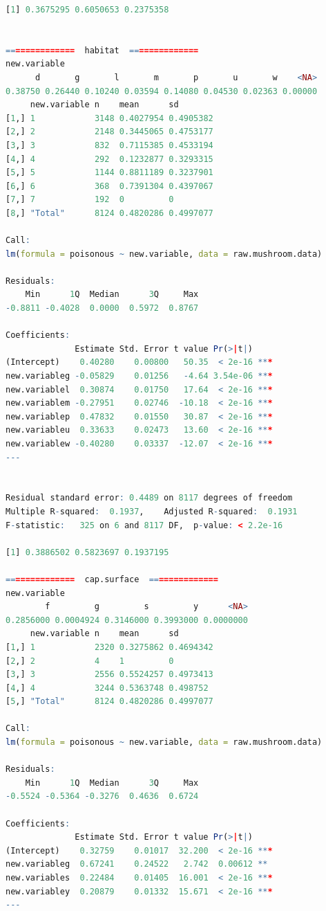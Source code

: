\documentclass[12pt]{article}
\begin{document}
\begin{lstlisting}[language = R]
[1] 0.3675295 0.6050653 0.2375358


==============  habitat  ==============
new.variable
      d       g       l       m       p       u       w    <NA> 
0.38750 0.26440 0.10240 0.03594 0.14080 0.04530 0.02363 0.00000 
     new.variable n    mean      sd       
[1,] 1            3148 0.4027954 0.4905382
[2,] 2            2148 0.3445065 0.4753177
[3,] 3            832  0.7115385 0.4533194
[4,] 4            292  0.1232877 0.3293315
[5,] 5            1144 0.8811189 0.3237901
[6,] 6            368  0.7391304 0.4397067
[7,] 7            192  0         0        
[8,] "Total"      8124 0.4820286 0.4997077

Call:
lm(formula = poisonous ~ new.variable, data = raw.mushroom.data)

Residuals:
    Min      1Q  Median      3Q     Max 
-0.8811 -0.4028  0.0000  0.5972  0.8767 

Coefficients:
              Estimate Std. Error t value Pr(>|t|)    
(Intercept)    0.40280    0.00800   50.35  < 2e-16 ***
new.variableg -0.05829    0.01256   -4.64 3.54e-06 ***
new.variablel  0.30874    0.01750   17.64  < 2e-16 ***
new.variablem -0.27951    0.02746  -10.18  < 2e-16 ***
new.variablep  0.47832    0.01550   30.87  < 2e-16 ***
new.variableu  0.33633    0.02473   13.60  < 2e-16 ***
new.variablew -0.40280    0.03337  -12.07  < 2e-16 ***
---


Residual standard error: 0.4489 on 8117 degrees of freedom
Multiple R-squared:  0.1937,	Adjusted R-squared:  0.1931 
F-statistic:   325 on 6 and 8117 DF,  p-value: < 2.2e-16

[1] 0.3886502 0.5823697 0.1937195

==============  cap.surface  ==============
new.variable
        f         g         s         y      <NA> 
0.2856000 0.0004924 0.3146000 0.3993000 0.0000000 
     new.variable n    mean      sd       
[1,] 1            2320 0.3275862 0.4694342
[2,] 2            4    1         0        
[3,] 3            2556 0.5524257 0.4973413
[4,] 4            3244 0.5363748 0.498752 
[5,] "Total"      8124 0.4820286 0.4997077

Call:
lm(formula = poisonous ~ new.variable, data = raw.mushroom.data)

Residuals:
    Min      1Q  Median      3Q     Max 
-0.5524 -0.5364 -0.3276  0.4636  0.6724 

Coefficients:
              Estimate Std. Error t value Pr(>|t|)    
(Intercept)    0.32759    0.01017  32.200  < 2e-16 ***
new.variableg  0.67241    0.24522   2.742  0.00612 ** 
new.variables  0.22484    0.01405  16.001  < 2e-16 ***
new.variabley  0.20879    0.01332  15.671  < 2e-16 ***
---



\end{lstlisting}
\end{document}
